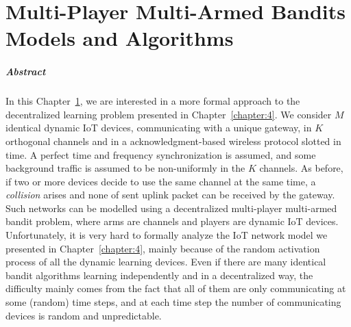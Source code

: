 
\chapter[Multi-Player Multi-Armed Bandits Models]{Multi-Player Multi-Armed Bandits Models and Algorithms}
\label{chapter:5}
\minitoc


\paragraph{Abstract}

In this Chapter~\ref{chapter:5}, we are interested in a more formal approach to the decentralized learning problem presented in Chapter~\ref{chapter:4}.
We consider $M$ identical dynamic IoT devices, communicating with a unique gateway, in $K$ orthogonal channels and in a acknowledgment-based wireless protocol slotted in time.
A perfect time and frequency synchronization is assumed,
and some \iid{} background traffic is assumed to be non-uniformly in the $K$ channels.
As before, if two or more devices decide to use the same channel at the same time, a \emph{collision} arises and none of sent uplink packet can be received by the gateway.
%
Such networks can be modelled using a decentralized multi-player multi-armed bandit problem, where arms are channels and players are dynamic IoT devices.
Unfortunately, it is very hard to formally analyze the IoT network model we presented in Chapter~\ref{chapter:4}, mainly because of the random activation process of all the dynamic learning devices.
Even if there are many identical bandit algorithms learning independently and in a decentralized way, the difficulty mainly comes from the fact that all of them are only communicating at some (random) time steps, and at each time step the number of communicating devices is random and unpredictable.

